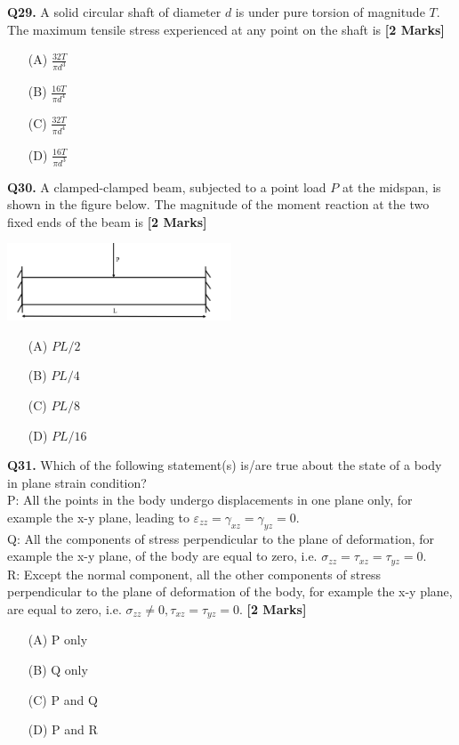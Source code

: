 \documentclass[11pt]{article}
\newcommand{\questionb}[2]{
    \noindent\textbf{Q#2.} #1 \hfill \textbf{[2 Marks]}
}
\begin{document}
\vspace{0.5cm}

\questionb{A solid circular shaft of diameter $d$ is under pure torsion of magnitude $T$. The maximum tensile stress experienced at any point on the shaft is}{29}
\begin{enumerate}
    \item[(A)] $\frac{32T}{\pi d^3}$  
    \item[(B)] $\frac{16T}{\pi d^4}$  
    \item[(C)] $\frac{32T}{\pi d^4}$  
    \item[(D)] $\frac{16T}{\pi d^3}$  
\end{enumerate}

\vspace{0.5cm}

\questionb{A clamped-clamped beam, subjected to a point load $P$ at the midspan, is shown in the figure below. The magnitude of the moment reaction at the two fixed ends of the beam is}{30}

\begin{center}
\includegraphics[width=0.5\textwidth]{figures/30.png}
\end{center}

\begin{enumerate}
    \item[(A)] $PL/2$  
    \item[(B)] $PL/4$  
    \item[(C)] $PL/8$  
    \item[(D)] $PL/16$  
\end{enumerate}

\vspace{0.5cm}

\questionb{Which of the following statement(s) is/are true about the state of a body in plane strain condition? \\
P: All the points in the body undergo displacements in one plane only, for example the x-y plane, leading to $\varepsilon_{zz} = \gamma_{xz} = \gamma_{yz} = 0$. \\
Q: All the components of stress perpendicular to the plane of deformation, for example the x-y plane, of the body are equal to zero, i.e. $\sigma_{zz} = \tau_{xz} = \tau_{yz} = 0$. \\
R: Except the normal component, all the other components of stress perpendicular to the plane of deformation of the body, for example the x-y plane, are equal to zero, i.e. $\sigma_{zz} \ne 0, \tau_{xz} = \tau_{yz} = 0$.}{31}
\begin{enumerate}
    \item[(A)] P only  
    \item[(B)] Q only  
    \item[(C)] P and Q  
    \item[(D)] P and R  
\end{enumerate}
\end{document}

